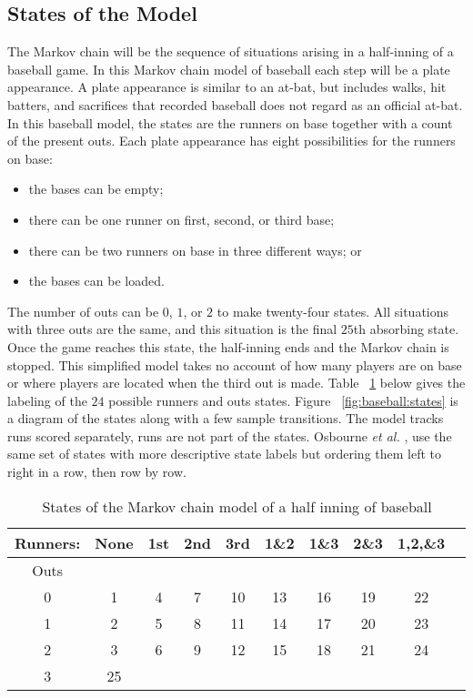 \documentclass[12pt]{article}
\begin{document}
\subsection*{States of the Model} The Markov chain will be the sequence
of situations arising in a half-inning of a baseball game.  In this
Markov chain model of baseball each step will be a plate appearance.  A
plate appearance is similar to an at-bat, but includes walks, hit
batters, and sacrifices that recorded baseball does not regard as an
official at-bat.  In this baseball model, the states are the runners on
base together with a count of the present outs.  Each plate appearance
has eight possibilities for the runners on base:
\begin{itemize}
    \item
        the bases can be empty;
    \item
        there can be one runner on first, second, or third base;
    \item
        there can be two runners on base in three different ways; or
    \item
        the bases can be loaded.
\end{itemize}
The number of outs can be \( 0 \), \( 1 \), or \( 2 \) to make
twenty-four states.  All situations with three outs are the same, and
this situation is the final \( 25 \)th absorbing state.  Once the game
reaches this state, the half-inning ends and the Markov chain is
stopped.  This simplified model takes no account of how many players are
on base or where players are located when the third out is made.  Table~%
\ref{tab:baseball:states} below gives the labeling of the \( 24 \)
possible runners and outs states.  Figure~%
\ref{fig:baseball:states} is a diagram of the states along with a few
sample transitions.  The model tracks runs scored separately, runs are
not part of the states.  Osbourne \emph{et al.}
\cite{osbourne20}, use the same set of states with more descriptive
state labels but ordering them left to right in a row, then row by row.
\begin{table}
    \centering
    \begin{tabular}{cccccccccc}
        \toprule Runners: & None & 1st & 2nd & 3rd & 1\&2 & 1\&3 & 2\&3 & 1,2,\&3 \\ 
        \midrule Outs     &      &     &     &     &      &      &      &         \\ 
        0                 & 1    & 4   & 7   & 10  & 13   & 16   & 19   & 22      \\ 
        1                 & 2    & 5   & 8   & 11  & 14   & 17   & 20   & 23      \\ 
        2                 & 3    & 6   & 9   & 12  & 15   & 18   & 21   & 24      \\ 
        3                 & 25   &     &     &     &      &      &      &         \\ 
        \bottomrule
    \end{tabular}
    \caption{States of the Markov chain model of a half inning of
    baseball}%
    \label{tab:baseball:states}
\end{table}
\end{document}

